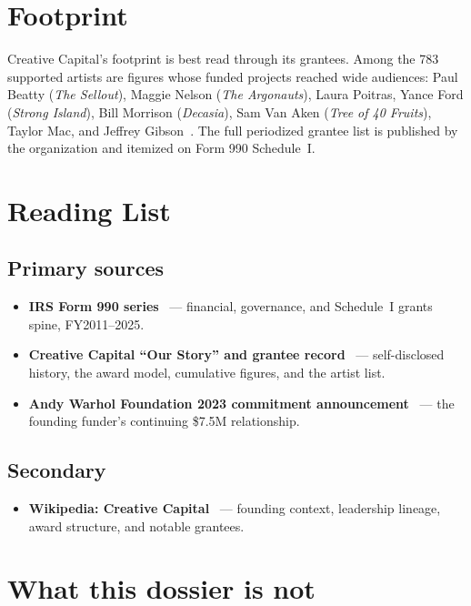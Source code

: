 \documentclass[10pt,letterpaper,twocolumn]{article}
\begin{document}
\section{Footprint}

Creative Capital's footprint is best read through its grantees. Among the 783 supported artists are figures whose funded projects reached wide audiences: Paul Beatty (\emph{The Sellout}), Maggie Nelson (\emph{The Argonauts}), Laura Poitras, Yance Ford (\emph{Strong Island}), Bill Morrison (\emph{Decasia}), Sam Van Aken (\emph{Tree of 40 Fruits}), Taylor Mac, and Jeffrey Gibson~\citep{ccwiki}. The full periodized grantee list is published by the organization and itemized on Form 990 Schedule~I.

\section{Reading List}

\subsection{Primary sources}

\begin{itemize}
\item \textbf{IRS Form 990 series}~\citep{ccpropublica} --- financial, governance, and Schedule~I grants spine, FY2011--2025.
\item \textbf{Creative Capital ``Our Story'' and grantee record}~\citep{cchistory} --- self-disclosed history, the award model, cumulative figures, and the artist list.
\item \textbf{Andy Warhol Foundation 2023 commitment announcement}~\citep{ccwarhol2023} --- the founding funder's continuing \$7.5M relationship.
\end{itemize}

\subsection{Secondary}

\begin{itemize}
\item \textbf{Wikipedia: Creative Capital}~\citep{ccwiki} --- founding context, leadership lineage, award structure, and notable grantees.
\end{itemize}

\section{What this dossier is not}
\end{document}

